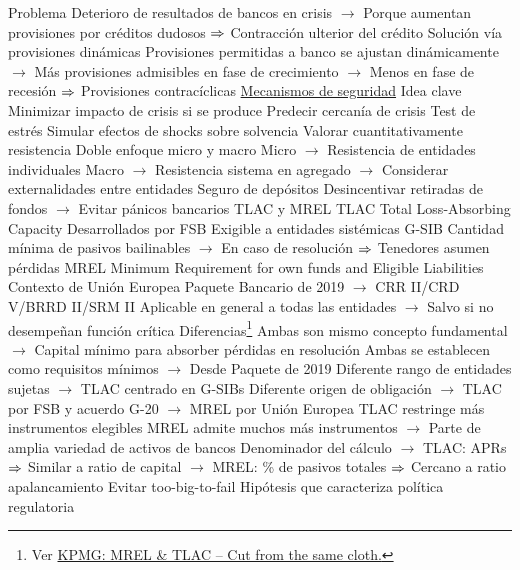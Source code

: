 \documentclass{nuevotema}
\begin{document}
\begin{esquemal}
				\4 Problema
				\4[] Deterioro de resultados de bancos en crisis
				\4[] $\to$ Porque aumentan provisiones por créditos dudosos
				\4[] $\Rightarrow$ Contracción ulterior del crédito
				\4 Solución vía provisiones dinámicas
				\4[] Provisiones permitidas a banco se ajustan dinámicamente
				\4[] $\to$ Más provisiones admisibles en fase de crecimiento
				\4[] $\to$ Menos en fase de recesión
				\4[] $\Rightarrow$ Provisiones contracíclicas
				\4[]
			\3 \underline{Mecanismos de seguridad}
			\3 Idea clave
				\4 Minimizar impacto de crisis si se produce
				\4 Predecir cercanía de crisis
			\3 Test de estrés
				\4 Simular efectos de shocks sobre solvencia
				\4 Valorar cuantitativamente resistencia
				\4 Doble enfoque micro y macro
				\4[] Micro
				\4[] $\to$ Resistencia de entidades individuales
				\4[] Macro
				\4[] $\to$ Resistencia sistema en agregado
				\4[] $\to$ Considerar externalidades entre entidades
			\3 Seguro de depósitos
				\4 Desincentivar retiradas de fondos
				\4 $\to$ Evitar pánicos bancarios
			\3 TLAC y MREL
				\4 TLAC
				\4[] Total Loss-Absorbing Capacity
				\4[] Desarrollados por FSB
				\4[] Exigible a entidades sistémicas G-SIB
				\4[] Cantidad mínima de pasivos bailinables
				\4[] $\to$ En caso de resolución
				\4[] $\Rightarrow$ Tenedores asumen pérdidas
				\4 MREL
				\4[] Minimum Requirement for own funds and Eligible Liabilities
				\4[] Contexto de Unión Europea
				\4[] Paquete Bancario de 2019
				\4[] $\to$ CRR II/CRD V/BRRD II/SRM II
				\4[] Aplicable en general a todas las entidades
				\4[] $\to$ Salvo si no desempeñan función crítica
				\4 Diferencias\footnote{Ver \href{https://home.kpmg/xx/en/home/insights/2016/12/mrel-tlac-cut-from-the-same-cloth-fs.html}{KPMG: MREL \& TLAC -- Cut from the same cloth.}}
				\4[] Ambas son mismo concepto fundamental
				\4[] $\to$ Capital mínimo para absorber pérdidas en resolución
				\4[] Ambas se establecen como requisitos mínimos
				\4[] $\to$ Desde Paquete de 2019
				\4[] Diferente rango de entidades sujetas
				\4[] $\to$ TLAC centrado en G-SIBs
				\4[] Diferente origen de obligación
				\4[] $\to$ TLAC por FSB y acuerdo G-20
				\4[] $\to$ MREL por Unión Europea
				\4[] TLAC restringe más instrumentos elegibles
				\4[] MREL admite muchos más instrumentos
				\4[] $\to$ Parte de amplia variedad de activos de bancos
				\4[] Denominador del cálculo
				\4[] $\to$ TLAC: APRs
				\4[] $\Rightarrow$ Similar a ratio de capital
				\4[] $\to$ MREL: \% de pasivos totales
				\4[] $\Rightarrow$ Cercano a ratio apalancamiento
			\3 Evitar too-big-to-fail
				\4 Hipótesis que caracteriza política regulatoria

\end{esquemal}
\end{document}
